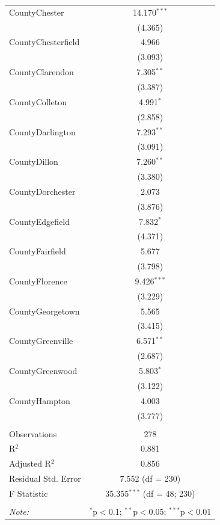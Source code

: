 \documentclass[11pt, oneside]{article}   	%
\theoremstyle{ModifiedStyle}
\begin{document}
\begin{table}[H]
\begin{tabular}{@{\extracolsep{5pt}}lc}
			 CountyChester & 14.170$^{***}$ \\
			 & (4.365) \\
			 CountyChesterfield & 4.966 \\
			 & (3.093) \\
			 CountyClarendon & 7.305$^{**}$ \\
			 & (3.387) \\
			 CountyColleton & 4.991$^{*}$ \\
			 & (2.858) \\
			 CountyDarlington & 7.293$^{**}$ \\
			 & (3.091) \\
			 CountyDillon & 7.260$^{**}$ \\
			 & (3.380) \\
			 CountyDorchester & 2.073 \\
			 & (3.876) \\
			 CountyEdgefield & 7.832$^{*}$ \\
			 & (4.371) \\
			 CountyFairfield & 5.677 \\
			 & (3.798) \\
			 CountyFlorence & 9.426$^{***}$ \\
			 & (3.229) \\
			 CountyGeorgetown & 5.565 \\
			 & (3.415) \\
			 CountyGreenville & 6.571$^{**}$ \\
			 & (2.687) \\
			 CountyGreenwood & 5.803$^{*}$ \\
			 & (3.122) \\
			 CountyHampton & 4.003 \\
			 & (3.777) \\

			 \hline \\[-1.8ex]
			 Observations & 278 \\
			 R$^{2}$ & 0.881 \\
			 Adjusted R$^{2}$ & 0.856 \\
			 Residual Std. Error & 7.552 (df = 230) \\
			 F Statistic & 35.355$^{***}$ (df = 48; 230) \\
			\hline
			\hline \\[-1.8ex]
			\textit{Note:}  & \multicolumn{1}{r}{$^{*}$p$<$0.1; $^{**}$p$<$0.05; $^{***}$p$<$0.01} \\
			\end{tabular}
		\end{table}
\end{document}
